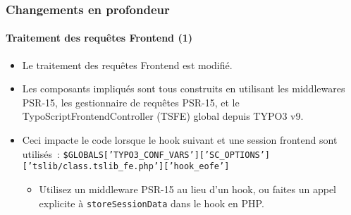 \begin{frame}[fragile]
	\frametitle{Changements en profondeur}
	\framesubtitle{Traitement des requêtes Frontend (1)}

	\lstset{basicstyle=\smaller\ttfamily}

	\begin{itemize}
		\item Le traitement des requêtes Frontend est modifié.

		\item Les composants impliqués sont tous construits en utilisant les middlewares PSR-15,
			les gestionnaire de requêtes PSR-15, et le TypoScriptFrontendController (TSFE) global
			depuis TYPO3 v9.

		\item Ceci impacte le code lorsque le hook suivant et une session frontend sont utilisés~:\newline
			{\fontsize{7}{8}\selectfont\texttt{\$GLOBALS['TYPO3\_CONF\_VARS']['SC\_OPTIONS']['tslib/class.tslib\_fe.php']['hook\_eofe']}}

			\begin{itemize}\smaller
				\item[\ding{228}] Utilisez un middleware PSR-15 au lieu d'un hook,
					ou faites un appel explicite à \texttt{storeSessionData}
					dans le hook en PHP\@.
			\end{itemize}\normalsize

	\end{itemize}

\end{frame}


